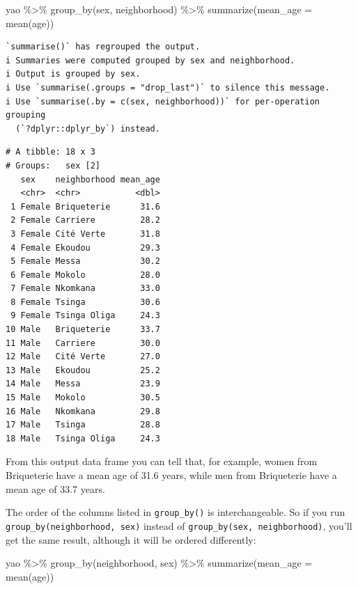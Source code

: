 \documentclass[
  letterpaper,
  DIV=11,
  numbers=noendperiod]{scrreprt}
\newenvironment{Shaded}{\begin{snugshade}}{\end{snugshade}}
\newcommand{\AttributeTok}[1]{\textcolor[rgb]{0.40,0.45,0.13}{#1}}
\newcommand{\FunctionTok}[1]{\textcolor[rgb]{0.28,0.35,0.67}{#1}}
\newcommand{\NormalTok}[1]{\textcolor[rgb]{0.00,0.23,0.31}{#1}}
\newcommand{\SpecialCharTok}[1]{\textcolor[rgb]{0.37,0.37,0.37}{#1}}
\begin{document}
\begin{Shaded}
\begin{Highlighting}[]
\NormalTok{yao }\SpecialCharTok{\%\textgreater{}\%} 
  \FunctionTok{group\_by}\NormalTok{(sex, neighborhood) }\SpecialCharTok{\%\textgreater{}\%} 
  \FunctionTok{summarize}\NormalTok{(}\AttributeTok{mean\_age =} \FunctionTok{mean}\NormalTok{(age))}
\end{Highlighting}
\end{Shaded}

\begin{verbatim}
`summarise()` has regrouped the output.
i Summaries were computed grouped by sex and neighborhood.
i Output is grouped by sex.
i Use `summarise(.groups = "drop_last")` to silence this message.
i Use `summarise(.by = c(sex, neighborhood))` for per-operation grouping
  (`?dplyr::dplyr_by`) instead.
\end{verbatim}

\begin{verbatim}
# A tibble: 18 x 3
# Groups:   sex [2]
   sex    neighborhood mean_age
   <chr>  <chr>           <dbl>
 1 Female Briqueterie      31.6
 2 Female Carriere         28.2
 3 Female Cité Verte       31.8
 4 Female Ekoudou          29.3
 5 Female Messa            30.2
 6 Female Mokolo           28.0
 7 Female Nkomkana         33.0
 8 Female Tsinga           30.6
 9 Female Tsinga Oliga     24.3
10 Male   Briqueterie      33.7
11 Male   Carriere         30.0
12 Male   Cité Verte       27.0
13 Male   Ekoudou          25.2
14 Male   Messa            23.9
15 Male   Mokolo           30.5
16 Male   Nkomkana         29.8
17 Male   Tsinga           28.8
18 Male   Tsinga Oliga     24.3
\end{verbatim}

From this output data frame you can tell that, for example, women from
Briqueterie have a mean age of 31.6 years, while men from Briqueterie
have a mean age of 33.7 years.

The order of the columns listed in \texttt{group\_by()} is
interchangeable. So if you run \texttt{group\_by(neighborhood,\ sex)}
instead of \texttt{group\_by(sex,\ neighborhood)}, you'll get the same
result, although it will be ordered differently:

\begin{Shaded}
\begin{Highlighting}[]
\NormalTok{yao }\SpecialCharTok{\%\textgreater{}\%} 
  \FunctionTok{group\_by}\NormalTok{(neighborhood, sex) }\SpecialCharTok{\%\textgreater{}\%} 
  \FunctionTok{summarize}\NormalTok{(}\AttributeTok{mean\_age =} \FunctionTok{mean}\NormalTok{(age))}
\end{Highlighting}
\end{Shaded}
\end{document}
